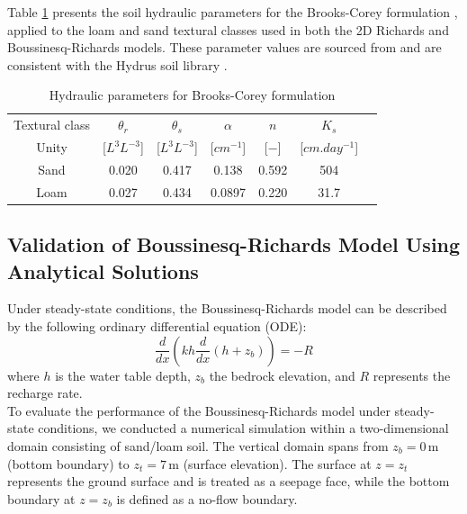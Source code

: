 \documentclass[12pt,a4paper]{article}
\begin{document}

Table \ref{tab:brooks_corey_parametrization} presents the soil hydraulic parameters for the Brooks-Corey formulation \cite{brooks1964hydraulic}, applied to the loam and sand textural classes used in both the 2D Richards and Boussinesq-Richards models. These parameter values are sourced from \cite{rawls1982} and are consistent with the Hydrus soil library \cite{simunek2008b}.\\
\begin{table}[h]
    \centering
    \begin{tabular}{c|c c c c c c}
         Textural class & $\theta_r$ & $\theta_s$ & $\alpha$ & $n$ & $K_s$ \\
Unity & [$L^{3}L^{-3}$] & [$L^{3}L^{-3}$] & [$cm^{-1}$] & [$-$] & [$cm.day^{-1}$]  \\
 \hline
         Sand & 0.020 & 0.417 & 0.138 & 0.592 & 504 \\
         Loam & 0.027 & 0.434 & 0.0897 & 0.220 & 31.7\\
    \end{tabular}
    \caption{Hydraulic parameters for Brooks-Corey formulation}
    \label{tab:brooks_corey_parametrization}
\end{table}

\subsection{Validation of Boussinesq-Richards Model Using Analytical Solutions}

Under steady-state conditions, the Boussinesq-Richards model can be described by the following ordinary differential equation (ODE):
\begin{equation}
\frac{d}{dx} \left( k h \frac{d}{dx}(h + z_b) \right) = -R
\end{equation}
where \( h \) is the water table depth, \( z_b \) the bedrock elevation, and \( R \) represents the recharge rate.\\

To evaluate the performance of the Boussinesq-Richards model under steady-state conditions, we conducted a numerical simulation within a two-dimensional domain consisting of sand/loam soil. The vertical domain spans from \( z_b = 0\,\text{m} \) (bottom boundary) to \( z_t = 7\,\text{m} \) (surface elevation). The surface at \( z = z_t \) represents the ground surface and is treated as a seepage face, while the bottom boundary at \( z = z_b \) is defined as a no-flow boundary.\\
\end{document}
